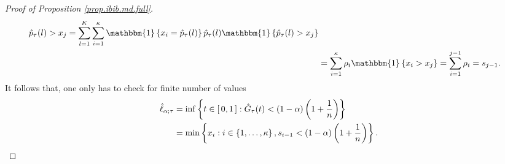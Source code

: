 \documentclass[11pt]{article}
\begin{document}
\begin{proof}[Proof of Proposition \ref{prop.ibib.md.full}]
\begin{align*}
{                \hat{p}_{\tau}(l)
            >
            x_j
        }
        = \sum_{l = 1}^{K}
            \sum_{i = 1}^{\kappa}
            \mathbbm{1}
            \brac{x_i = \hat{p}_{\tau}(l)}
            \hat{p}_{\tau}(l)
            \mathbbm{1} \brac{
                \hat{p}_{\tau}(l)
            >
            x_j
        }
        \\
        &
        =
        \sum_{i = 1}^{\kappa}
            \rho_i
            \mathbbm{1} \brac{
                x_i > x_j
        }
        =
        \sum_{i = 1}^{j-1}
        \rho_i = s_{j-1}.
    \end{align*}
    It follows that, one only has to check for finite number of values
    \begin{align*}
        \hat{\ell}_{\alpha; \tau}
        &
        = \inf
        \left\{ 
            t \in \left[\, 0, 1 \,\right]
            : \hat{G}_{\tau}(t) < \left( 1 - \alpha \right)\left( 1 + \frac{1}{n} \right) 
         \right\}
        \\
        &
        =
        \min
        \left\{ 
            x_i
            : 
            i \in \left\{ 1, \ldots, \kappa \right\},
            s_{i-1} < \left( 1 - \alpha \right)\left( 1 + \frac{1}{n} \right)
         \right\}.
    \end{align*}
\end{proof}
\end{document}
